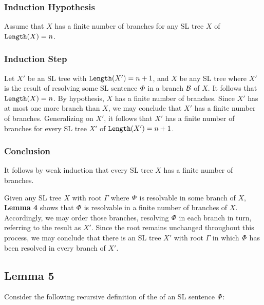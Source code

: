 \subsubsection{Induction Hypothesis}

Assume that $X$ has a finite number of branches for any SL tree $X$ of $\texttt{Length}(X)=n$. 


\subsubsection{Induction Step}

Let $X'$ be an SL tree with $\texttt{Length}(X')=n+1$, and $X$ be any SL tree where $X'$ is the result of resolving some SL sentence $\varPhi$ in a branch $\mathcal{B}$ of $X$.
It follows that $\texttt{Length}(X)=n$.
By hypothesis, $X$ has a finite number of branches.
Since $X'$ has at most one more branch than $X$, we may conclude that $X'$ has a finite number of branches. 
Generalizing on $X'$, it follows that $X'$ has a finite number of branches for every SL tree $X'$ of $\texttt{Length}(X')=n+1$.




\subsubsection{Conclusion}

It follows by weak induction that every SL tree $X$ has a finite number of branches. 

Given any SL tree $X$ with root $\Gamma$ where $\varPhi$ is resolvable in some branch of $X$, \textbf{Lemma 4} shows that $\varPhi$ is resolvable in a finite number of branches of $X$.
Accordingly, we may order those branches, resolving $\varPhi$ in each branch in turn, referring to the result as $X'$. 
Since the root remains unchanged throughout this process, we may conclude that there is an SL tree $X'$ with root $\Gamma$ in which $\varPhi$ has been resolved in every branch of $X'$.



\subsection{Lemma 5}


Consider the following recursive definition of the  of an SL sentence $\varPhi$:

